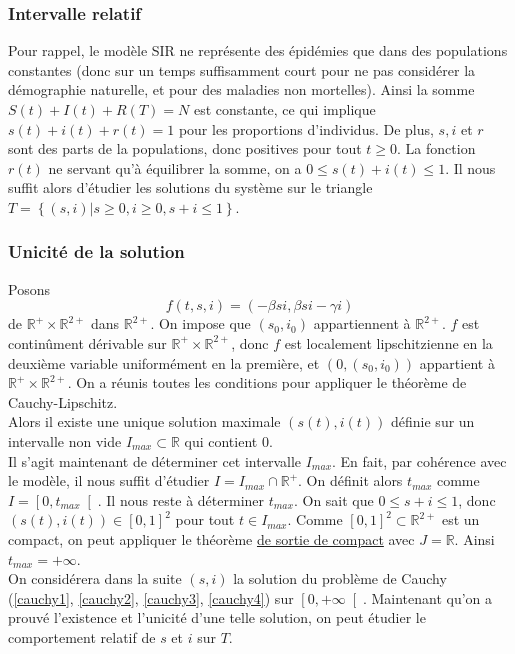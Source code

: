 \documentclass[a4paper]{article}
\theoremstyle{plain}
\theoremstyle{definition}
\theoremstyle{remark}
\begin{document}
\subsubsection{Intervalle relatif}
    Pour rappel, le modèle SIR ne représente des épidémies que dans des populations constantes (donc sur un temps suffisamment court pour ne pas considérer la démographie naturelle, et pour des maladies non mortelles). Ainsi la somme $S(t)+I(t)+R(T)=N$ est constante, ce qui implique $s(t)+i(t)+r(t)=1$ pour les proportions d'individus. De plus, $s, i$ et $r$ sont des parts de la populations, donc positives pour tout $t \geqslant 0 $. La fonction $r(t)$ ne servant qu'à équilibrer la somme, on a $0 \leqslant s(t)+i(t) \leqslant 1$. Il nous suffit alors d'étudier les solutions du système sur le triangle $T=\left\{(s,i) | s\geqslant0, i\geqslant0, s+i\leqslant1\right\}$. \\
    \subsubsection{Unicité de la solution}
	Posons
	\begin{equation}
	   \label{f}
	    f(t,s,i)=(- \beta s i, \beta s i - \gamma i)
	\end{equation}de $\mathbb{R}^{+}\times\mathbb{R}^{2+}$ dans $\mathbb{R}^{2+}$.
	On impose que $(s_0,i_0)$ appartiennent à $\mathbb{R}^{2+}$.
	$f$ est continûment dérivable sur $\mathbb{R}^{+}\times\mathbb{R}^{2+}$, donc $f$ est localement lipschitzienne en la deuxième variable uniformément en la première, et $(0,(s_0,i_0))$ appartient à $\mathbb{R}^{+}\times\mathbb{R}^{2+}$. On a réunis toutes les conditions pour appliquer le théorème de Cauchy-Lipschitz.\\
	Alors il existe une unique solution maximale $(s(t), i(t))$ définie sur un intervalle non vide $I_{max}\subset\mathbb{R}$ qui contient $0$.\\
	Il s'agit maintenant de déterminer cet intervalle $I_{max}$. En fait, par cohérence avec le modèle, il nous suffit d'étudier $I=I_{max}\cap\mathbb{R}^+$. On définit alors $t_{max}$ comme $I= \left[0,t_{max}\right[ $. Il nous reste à déterminer $t_{max}$. \newline
	On sait que $0 \leqslant s+i \leqslant 1$, donc $(s(t),i(t))\in \left[ 0,1 \right] ^2$ pour tout $t\in I_{max}$. Comme $\left[0,1\right]^2\subset\mathbb{R}^{2+}$ est un compact, on peut appliquer le théorème \hyperlink{compact}{de sortie de compact} avec $J=\mathbb{R}$. Ainsi $t_{max}=+\infty$.\\
	On considérera dans la suite $(s,i)$ la solution du problème de Cauchy (\eqref{cauchy1}, \eqref{cauchy2}, \eqref{cauchy3}, \eqref{cauchy4}) sur $\left[ 0, +\infty \right[$. Maintenant qu'on a prouvé l'existence et l'unicité d'une telle solution, on peut étudier le comportement relatif de $s$ et $i$ sur $T$.
	
\end{document}
